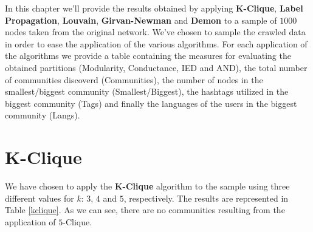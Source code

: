 In this chapter we'll provide the results obtained by applying \textbf{K-Clique}, \textbf{Label Propagation},
\textbf{Louvain}, \textbf{Girvan-Newman} and \textbf{Demon} to a sample of $1000$ nodes taken from the original
network. We've chosen to sample the crawled data in order to ease the application of the various algorithms.
For each application of the algorithms we provide a table containing the measures for evaluating the obtained
partitions (Modularity, Conductance, IED and AND), the total number of communities discoverd
(Communities), the number of nodes in the smallest/biggest community (Smallest/Biggest), the hashtags utilized
in the biggest community (Tags) and finally the languages of the users in the biggest community (Langs).

\section{K-Clique} %
\label{sec:k_clique}
    We have chosen to apply the \textbf{K-Clique} algorithm to the sample using three different values for
    $k$: $3$, $4$ and $5$, respectively. The results are represented in Table \ref{kclique}. As we can see, there are
    no communities resulting from the application of $5$-Clique.

    \begin{table}[H]
        \centering
        \begin{subtable}{0.60\textwidth}
        \end{subtable}
        \caption{Evaluation of the partitions obtained by the application of the K-Clique algorithm.}
        \label{kclique}
    \end{table}



